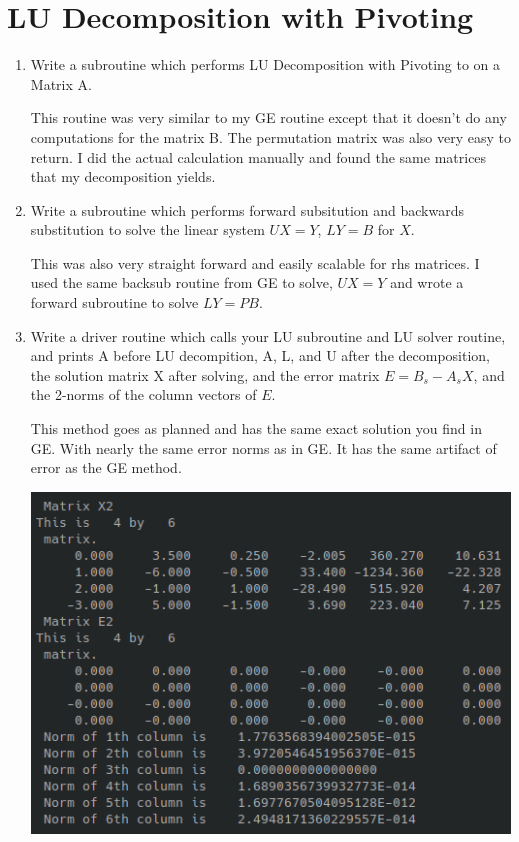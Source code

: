 \documentclass{article}
\begin{document}
\section{LU Decomposition with Pivoting}
\begin{enumerate}
\item Write a subroutine which performs LU Decomposition with Pivoting to on a Matrix A. 

This routine was very similar to my GE routine except that it doesn't do any computations for the matrix B. The permutation matrix was also very easy to return. I did the actual calculation manually and found the same matrices that my decomposition yields. 

\item Write a subroutine which performs forward subsitution and backwards substitution to solve the linear system $UX = Y$, $LY = B$ for $X$. 

This was also very straight forward and easily scalable for rhs matrices. I used the same backsub routine from GE to solve, $UX = Y$ and wrote a forward subroutine to solve $LY = PB$. 

\item Write a driver routine which calls your LU subroutine and LU solver routine, and prints A before LU decompition, A, L, and U after the decomposition, the solution matrix X after solving, and the error matrix $E = B_s - A_sX$, and the 2-norms of the column vectors of $E$. 

This method goes as planned and has the same exact solution you find in GE. With nearly the same error norms as in GE. It has the same artifact of error as the GE method. 

\begin{center}
    \includegraphics[width = .6\textwidth]{files/LUsol.png}
\end{center}

\end{enumerate}
\end{document}
